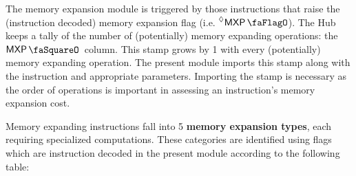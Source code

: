 The memory expansion module is triggered by those instructions that raise the (instruction decoded) memory expansion flag (i.e. $\decMxpFlag$).
The Hub keeps a tally of the number of (potentially) memory expanding operations: the $\mxpStamp$ column.
This stamp grows by 1 with every (potentially) memory expanding operation.
The present module imports this stamp along with the instruction and appropriate parameters. Importing the stamp is necessary as the order of operations is important in assessing an instruction's memory expansion cost.

Memory expanding instructions fall into 5 \textbf{memory expansion types}, each requiring specialized computations. These categories are identified using flags which are instruction decoded in the present module according to the following table:

